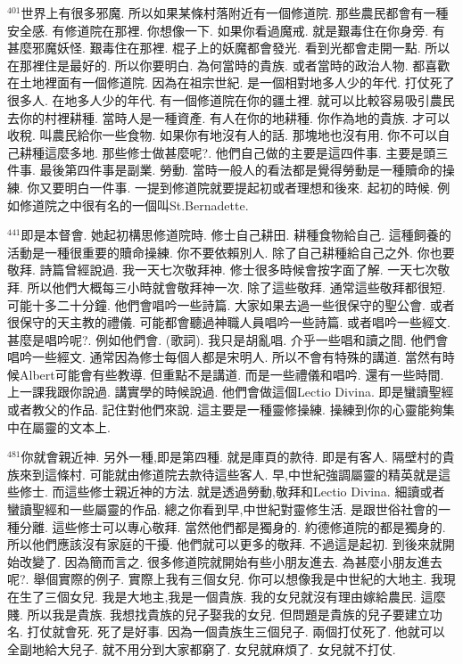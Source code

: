 \documentclass{book}
\begin{document}
$^{401}$世界上有很多邪魔.
所以如果某條村落附近有一個修道院.
那些農民都會有一種安全感.
有修道院在那裡.
你想像一下.
如果你看過魔戒.
就是艱毒住在你身旁.
有甚麼邪魔妖怪.
艱毒住在那裡.
棍子上的妖魔都會發光.
看到光都會走開一點.
所以在那裡住是最好的.
所以你要明白.
為何當時的貴族.
或者當時的政治人物.
都喜歡在土地裡面有一個修道院.
因為在祖宗世紀.
是一個相對地多人少的年代.
打仗死了很多人.
在地多人少的年代.
有一個修道院在你的疆土裡.
就可以比較容易吸引農民去你的村裡耕種.
當時人是一種資產.
有人在你的地耕種.
你作為地的貴族.
才可以收稅.
叫農民給你一些食物.
如果你有地沒有人的話.
那塊地也沒有用.
你不可以自己耕種這麼多地.
那些修士做甚麼呢?.
他們自己做的主要是這四件事.
主要是頭三件事.
最後第四件事是副業.
勞動.
當時一般人的看法都是覺得勞動是一種贖命的操練.
你又要明白一件事.
一提到修道院就要提起初或者理想和後來.
起初的時候.
例如修道院之中很有名的一個叫St.Bernadette.

$^{441}$即是本督會.
她起初構思修道院時.
修士自己耕田.
耕種食物給自己.
這種飼養的活動是一種很重要的贖命操練.
你不要依賴別人.
除了自己耕種給自己之外.
你也要敬拜.
詩篇曾經說過.
我一天七次敬拜神.
修士很多時候會按字面了解.
一天七次敬拜.
所以他們大概每三小時就會敬拜神一次.
除了這些敬拜.
通常這些敬拜都很短.
可能十多二十分鐘.
他們會唱吟一些詩篇.
大家如果去過一些很保守的聖公會.
或者很保守的天主教的禮儀.
可能都會聽過神職人員唱吟一些詩篇.
或者唱吟一些經文.
甚麼是唱吟呢?.
例如他們會.
(歌詞).
我只是胡亂唱.
介乎一些唱和讀之間.
他們會唱吟一些經文.
通常因為修士每個人都是宋明人.
所以不會有特殊的講道.
當然有時候Albert可能會有些教導.
但重點不是講道.
而是一些禮儀和唱吟.
還有一些時間.
上一課我跟你說過.
講實學的時候說過.
他們會做這個Lectio Divina.
即是蠻讀聖經或者教父的作品.
記住對他們來說.
這主要是一種靈修操練.
操練到你的心靈能夠集中在屬靈的文本上.

$^{481}$你就會親近神.
另外一種,即是第四種.
就是庫頁的款待.
即是有客人.
隔壁村的貴族來到這條村.
可能就由修道院去款待這些客人.
早,中世紀強調屬靈的精英就是這些修士.
而這些修士親近神的方法.
就是透過勞動,敬拜和Lectio Divina.
細讀或者蠻讀聖經和一些屬靈的作品.
總之你看到早,中世紀對靈修生活.
是跟世俗社會的一種分離.
這些修士可以專心敬拜.
當然他們都是獨身的.
約德修道院的都是獨身的.
所以他們應該沒有家庭的干擾.
他們就可以更多的敬拜.
不過這是起初.
到後來就開始改變了.
因為簡而言之.
很多修道院就開始有些小朋友進去.
為甚麼小朋友進去呢?.
舉個實際的例子.
實際上我有三個女兒.
你可以想像我是中世紀的大地主.
我現在生了三個女兒.
我是大地主,我是一個貴族.
我的女兒就沒有理由嫁給農民.
這麼賤.
所以我是貴族.
我想找貴族的兒子娶我的女兒.
但問題是貴族的兒子要建立功名.
打仗就會死.
死了是好事.
因為一個貴族生三個兒子.
兩個打仗死了.
他就可以全副地給大兒子.
就不用分到大家都窮了.
女兒就麻煩了.
女兒就不打仗.
\end{document}
